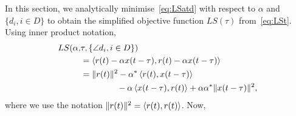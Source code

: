 \documentclass[journal]{IEEEtranTCOM}
\begin{document}
In this section, we analytically minimise~\eqref{eq:LSatd} with respect to $\alpha$ and $\{d_i, i \in D\}$ to obtain the simplified objective function $LS(\tau)$ from~\eqref{eq:LSt}.  Using inner product notation,
\begin{align}
LS(\alpha,&\tau,\{\angle d_i, i \in D\})   \nonumber  \\
&= \dotprod{r(t) - \alpha x(t - \tau)}{r(t) - \alpha x(t - \tau)}  \nonumber  \\
&= \|r(t)\|^2 - \alpha^*\dotprod{r(t)}{x(t - \tau)}  \nonumber \\
 &\hspace{1.5cm}- \alpha\dotprod{x(t - \tau)}{r(t)} + \alpha\alpha^*\|x(t - \tau)\|^2, \nonumber %
\end{align}
where we use the notation $\|r(t)\|^2 = \left\langle r(t) , r(t) \right\rangle$.  Now,
\end{document}
